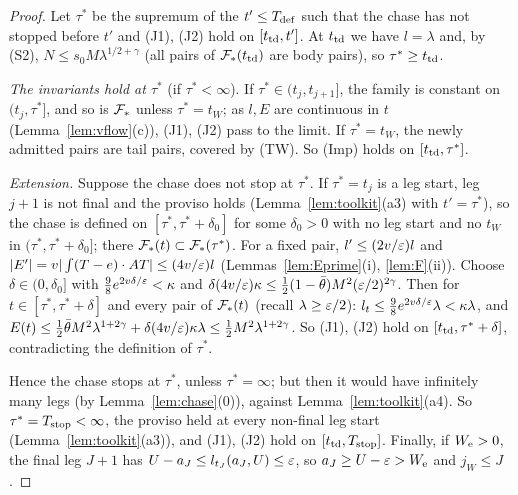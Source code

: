 \begin{proof}
Let $\tau^*$ be the supremum of the $t'\le T_{\mathrm{def}}$ such that the chase has not stopped before $t'$ and (J1), (J2) hold on
$[t_{\mathrm{td}},t']$. At $t_{\mathrm{td}}$ we have $l=\lambda$ and, by (S2), $N\le s_0M\lambda^{1/2+\gamma}$ (all pairs of
$\mathcal{F}_*(t_{\mathrm{td}})$ are body pairs), so $\tau^*\ge t_{\mathrm{td}}$.

\emph{The invariants hold at $\tau^*$} (if $\tau^*<\infty$). If $\tau^*\in(t_j,t_{j+1}]$, the family is constant on
$(t_j,\tau^*]$, and so is $\mathcal{F}_*$ unless $\tau^*=t_W$; as $l,E$ are continuous in $t$ (Lemma~\ref{lem:vflow}(c)), (J1),
(J2) pass to the limit. If $\tau^*=t_W$, the newly admitted pairs are tail pairs, covered by (TW). So (Imp) holds on
$[t_{\mathrm{td}},\tau^*]$.

\emph{Extension.} Suppose the chase does not stop at $\tau^*$. If $\tau^*=t_j$ is a leg start, leg $j+1$ is not final
and the proviso holds (Lemma~\ref{lem:toolkit}(a3) with $t'=\tau^*$), so the chase is defined on
$[\tau^*,\tau^*+\delta_0]$ for some $\delta_0>0$ with no leg start and no $t_W$ in $(\tau^*,\tau^*+\delta_0]$; there
$\mathcal{F}_*(t)\subset\mathcal{F}_*(\tau^*)$. For a fixed pair, $l'\le(2v/\varepsilon)l$ and $|E'|=v|\int(T-e)\cdot AT|\le(4v/\varepsilon)l$
(Lemmas~\ref{lem:Eprime}(i), \ref{lem:F}(ii)). Choose $\delta\in(0,\delta_0]$ with $\frac98e^{2v\delta/\varepsilon}<\kappa$ and
$\delta(4v/\varepsilon)\kappa\le\frac12(1-\bar\theta)M^2(\varepsilon/2)^{2\gamma}$. Then for $t\in[\tau^*,\tau^*+\delta]$ and every
pair of $\mathcal{F}_*(t)$ (recall $\lambda\ge\varepsilon/2$): $l_t\le\frac98e^{2v\delta/\varepsilon}\lambda<\kappa\lambda$, and
$E(t)\le\frac12\bar\theta M^2\lambda^{1+2\gamma}+\delta(4v/\varepsilon)\kappa\lambda\le\frac12M^2\lambda^{1+2\gamma}$. So
(J1), (J2) hold on $[t_{\mathrm{td}},\tau^*+\delta]$, contradicting the definition of $\tau^*$.

Hence the chase stops at $\tau^*$, unless $\tau^*=\infty$; but then it would have infinitely many legs (by
Lemma~\ref{lem:chase}(0)), against Lemma~\ref{lem:toolkit}(a4). So $\tau^*=T_{\mathrm{stop}}<\infty$, the proviso held at every
non-final leg start (Lemma~\ref{lem:toolkit}(a3)), and (J1), (J2) hold on $[t_{\mathrm{td}},T_{\mathrm{stop}}]$. Finally, if $W_{\mathrm{e}}>0$, the final leg $J+1$ has $U-a_J\le l_{t_J}(a_J,U)\le\varepsilon$, so
$a_J\ge U-\varepsilon>W_{\mathrm{e}}$ and $j_W\le J$.
\end{proof}

